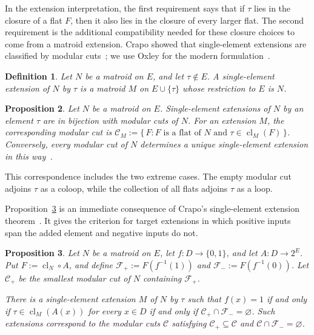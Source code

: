 \documentclass[11pt]{article}
\numberwithin{equation}{section}
\newtheorem{definition}{Definition}[section]
\newtheorem{proposition}[definition]{Proposition}
\theoremstyle{remark}
\newcommand{\cl}{\operatorname{cl}}
\begin{document}
In the extension interpretation, the first requirement says that if $\tau$ lies in the closure of a flat $F$, then it also lies in the closure of every larger flat. The second requirement is the additional compatibility needed for these closure choices to come from a matroid extension. Crapo showed that single-element extensions are classified by modular cuts~\cite{Crapo1965}; we use Oxley for the modern formulation~\cite{Oxley2011}.

\begin{definition}
\label{def:single-element-extension}
Let $N$ be a matroid on $E$, and let $\tau\notin E$. A \emph{single-element extension} of $N$ by $\tau$ is a matroid $M$ on $E\cup\{\tau\}$ whose restriction to $E$ is $N$.
\end{definition}

\begin{proposition}
\label{prop:modular-cut-extension}
Let $N$ be a matroid on $E$. Single-element extensions of $N$ by an element $\tau$ are in bijection with modular cuts of $N$. For an extension $M$, the corresponding modular cut is $\mathcal C_M:=\{\,F:F\text{ is a flat of }N\text{ and }\tau\in\cl_M(F)\,\}$. Conversely, every modular cut of $N$ determines a unique single-element extension in this way~\cite{Crapo1965}.
\end{proposition}

This correspondence includes the two extreme cases. The empty modular cut adjoins $\tau$ as a coloop, while the collection of all flats adjoins $\tau$ as a loop.

Proposition~\ref{prop:target-extension-criterion} is an immediate consequence
of Crapo's single-element extension theorem~\cite{Crapo1965}. It gives the
criterion for target extensions in which positive inputs span the added element and
negative inputs do not.

\begin{proposition}
\label{prop:target-extension-criterion}
Let $N$ be a matroid on $E$, let $f:D\to\{0,1\}$, and let $A:D\to 2^E$. Put $F:=\cl_N\circ A$, and define $\mathcal F_+:=F(f^{-1}(1))$ and $\mathcal F_-:=F(f^{-1}(0))$. Let $\mathcal C_+$ be the smallest modular cut of $N$ containing $\mathcal F_+$.

There is a single-element extension $M$ of $N$ by $\tau$ such that $f(x)=1$ if and only if $\tau\in\cl_M(A(x))$ for every $x\in D$ if and only if $\mathcal C_+\cap\mathcal F_-=\varnothing$. Such extensions correspond to the modular cuts $\mathcal C$ satisfying $\mathcal C_+\subseteq\mathcal C$ and $\mathcal C\cap\mathcal F_-=\varnothing$.
\end{proposition}
\end{document}
